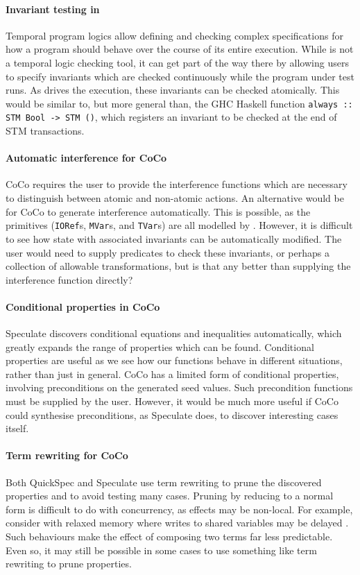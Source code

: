 \paragraph{Invariant testing in \dejafu{}}
Temporal program logics \parencite{pnueli1977} allow defining and
checking complex specifications for how a program should behave over
the course of its entire execution.  While \dejafu{} is not a temporal
logic checking tool, it can get part of the way there by allowing
users to specify invariants which are checked continuously while the
program under test runs.  As \dejafu{} drives the execution, these
invariants can be checked atomically.  This would be similar to, but
more general than, the GHC Haskell function
\verb|always :: STM Bool -> STM ()|, which registers an invariant to
be checked at the end of STM transactions.

\paragraph{Automatic interference for CoCo}
CoCo requires the user to provide the interference functions which are
necessary to distinguish between atomic and non-atomic actions.  An
alternative would be for CoCo to generate interference automatically.
This is possible, as the primitives (\verb|IORef|s, \verb|MVar|s, and
\verb|TVar|s) are all modelled by \dejafu{}.  However, it is difficult
to see how state with associated invariants can be automatically
modified.  The user would need to supply predicates to check these
invariants, or perhaps a collection of allowable transformations, but
is that any better than supplying the interference function directly?

\paragraph{Conditional properties in CoCo}
Speculate \parencite{braquehais2017} discovers conditional equations
and inequalities automatically, which greatly expands the range of
properties which can be found.  Conditional properties are useful as
we see how our functions behave in different situations, rather than
just in general.  CoCo has a limited form of conditional properties,
involving preconditions on the generated seed values.  Such
precondition functions must be supplied by the user.  However, it
would be much more useful if CoCo could synthesise preconditions, as
Speculate does, to discover interesting cases itself.

\paragraph{Term rewriting for CoCo}
Both QuickSpec \parencite{smallbone2017} and Speculate \parencite{braquehais2017}
use term rewriting to prune the discovered properties and to avoid
testing many cases.  Pruning by reducing to a normal form is difficult
to do with concurrency, as effects may be non-local.  For example,
consider with relaxed memory where writes to shared variables may be
delayed \parencite{zhang2015}.  Such behaviours make the effect of composing
two terms far less predictable.  Even so, it may still be possible in
some cases to use something like term rewriting to prune properties.

